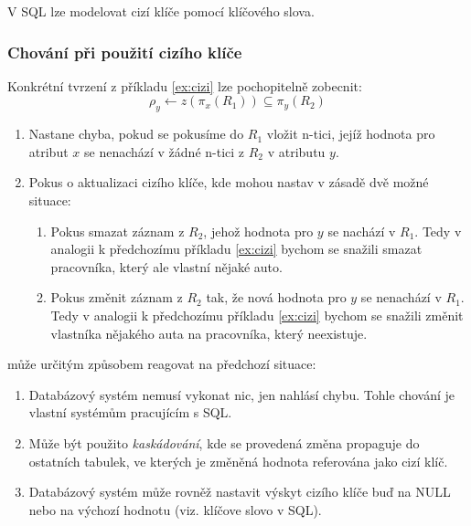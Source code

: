 V SQL lze modelovat cizí klíče pomocí klíčového slova.

\subsubsection{Chování při použití cizího klíče}
Konkrétní tvrzení z příkladu \ref{ex:cizi} lze pochopitelně zobecnit:
$$
\rho_{y} \leftarrow z(\pi_{x} \left( R_{1} \right) ) \subseteq \pi_{y} \left( R_{2} \right)
$$
\begin{enumerate}
\item Nastane chyba, pokud se pokusíme do $R_{1}$ vložit n-tici, jejíž hodnota pro atribut $x$  se nenachází v žádné n-tici z $R_{2}$ v atributu $y$.
\item Pokus o aktualizaci cizího klíče, kde mohou nastav v zásadě dvě možné situace:
\begin{enumerate}
\item Pokus smazat záznam z $R_{2}$, jehož hodnota pro $y$ se nachází v $R_{1}$. Tedy v analogii k předchozímu příkladu \ref{ex:cizi} bychom se snažili smazat pracovníka, který ale vlastní nějaké auto.
\item Pokus změnit záznam z $R_{2}$ tak, že nová hodnota pro $y$ se nenachází v $R_{1}$. Tedy v analogii k předchozímu příkladu \ref{ex:cizi} bychom se snažili změnit vlastníka nějakého auta na pracovníka, který neexistuje.
\end{enumerate}
\end{enumerate}

 může určitým způsobem reagovat na předchozí situace:
\begin{enumerate}
\item Databázový systém nemusí vykonat nic, jen nahlásí chybu. Tohle chování je vlastní systémům pracujícím s SQL.
\item Může být použito \textit{kaskádování}, kde se provedená změna propaguje do ostatních tabulek, ve kterých je změněná hodnota referována jako cizí klíč.
\item Databázový systém může rovněž nastavit výskyt cizího klíče buď na NULL nebo na výchozí hodnotu (viz. klíčove slovo v SQL).
\end{enumerate}


